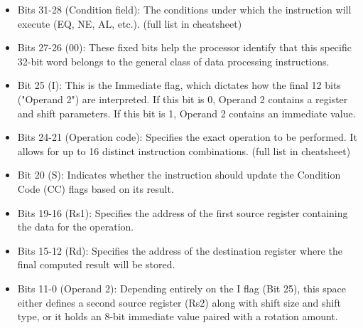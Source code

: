 \documentclass[../comorg-part1.tex]{subfiles}
\begin{document}
\begin{itemize}
    \item Bits 31-28 (Condition field): The conditions under which  the instruction will execute (EQ, NE, AL, etc.). (full list in cheatsheet)
    \item Bits 27-26 (00): These fixed bits help the processor identify that this specific 32-bit word belongs to the general class of data processing instructions.
    \item Bit 25 (I): This is the Immediate flag, which dictates how the final 12 bits ("Operand 2") are interpreted. If this bit is 0, Operand 2 contains a register and shift parameters. If this bit is 1, Operand 2 contains an immediate value.
    \item Bits 24-21 (Operation code): Specifies the exact operation to be performed. It allows for up to 16 distinct instruction combinations. (full list in cheatsheet)
    \item Bit 20 (S): Indicates whether the instruction should update the Condition Code (CC) flags based on its result.
    \item Bits 19-16 (Rs1): Specifies the address of the first source register containing the data for the operation.
    \item Bits 15-12 (Rd): Specifies the address of the destination register where the final computed result will be stored.
    \item Bits 11-0 (Operand 2): Depending entirely on the I flag (Bit 25), this space either defines a second source register (Rs2) along with shift size and shift type, or it holds an 8-bit immediate value paired with a rotation amount.
\end{itemize}
\end{document}
